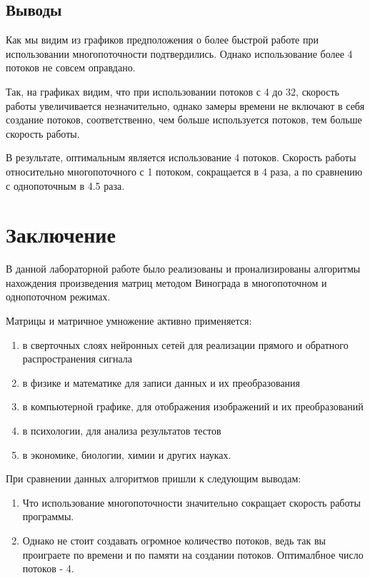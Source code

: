\documentclass[a4paper,14pt]{article} %
\newcommand{\anonsection}[1]{\section*{#1}\addcontentsline{toc}{section}{#1}}
\begin{document}
	\subsection{Выводы}
	\hfill
	
	Как мы видим из графиков предположения о более быстрой работе при использовании многопоточности подтвердились. Однако использование более 4 потоков не совсем оправдано. 
	
	Так, на графиках видим, что при использовании потоков с 4 до 32, скорость работы увеличивается незначительно, однако замеры времени не включают в себя создание потоков, соответственно, чем больше используется потоков, тем больше скорость работы. 
	
	В результате, оптимальным является использование 4 потоков. Скорость работы относительно многопоточного с 1 потоком, сокращается в 4 раза, а по сравнению с однопоточным в 4.5 раза. 
	
   	\newpage

        \anonsection{Заключение}
        
        \hfill
        
        В данной лабораторной работе было реализованы и пронализированы алгоритмы нахождения произведения матриц методом Винограда в многопоточном и однопоточном режимах. 
	
	\hfill
	
	Матрицы и матричное умножение активно применяется:
	\begin{enumerate}
		\item в сверточных слоях нейронных сетей для реализации прямого и обратного распространения сигнала
		\item в физике и математике для записи данных и их преобразования
		\item в компьютерной графике, для отображения изображений и их преобразований
		\item в психологии, для анализа результатов тестов
		\item в экономике, биологии, химии и других науках. 
	\end{enumerate}
	
	\hfill
	
	При сравнении данных алгоритмов пришли к следующим выводам:
	\begin{enumerate}
 		\item Что использование многопоточности значительно сокращает скорость работы программы.  
 		\item Однако не стоит создавать огромное количество потоков, ведь так вы проиграете по времени и по памяти на создании потоков. Оптималбное число потоков - 4. 
	\end{enumerate}
	
\end{document}
